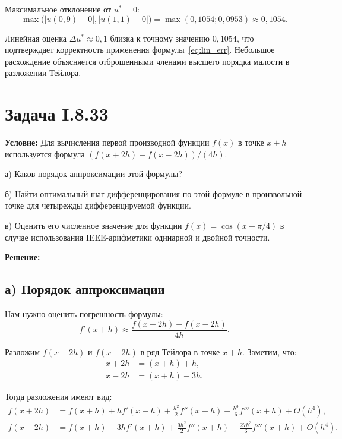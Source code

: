 \documentclass{article}
\begin{document}
Максимальное отклонение от $u^* = 0$:
\begin{equation}
\max\bigl(|u(0{,}9) - 0|, |u(1{,}1) - 0|\bigr) = \max(0{,}1054; 0{,}0953) \approx 0{,}1054.
\end{equation}

Линейная оценка $\Delta u^* \approx 0{,}1$ близка к точному значению $0{,}1054$, что подтверждает корректность применения формулы~\eqref{eq:lin_err}. Небольшое расхождение объясняется отброшенными членами высшего порядка малости в разложении Тейлора.



\section*{Задача I.8.33}

\textbf{Условие:} Для вычисления первой производной функции $f(x)$ в точке $x + h$ используется формула $(f(x+2h) - f(x-2h))/(4h)$.

а) Каков порядок аппроксимации этой формулы?

б) Найти оптимальный шаг дифференцирования по этой формуле в произвольной точке для четырежды дифференцируемой функции.

в) Оценить его численное значение для функции $f(x) = \cos(x + \pi/4)$ в случае использования IEEE-арифметики одинарной и двойной точности.

\vspace{0.5cm}
\textbf{Решение:}

\subsection*{а) Порядок аппроксимации}

Нам нужно оценить погрешность формулы:
\begin{equation}
f'(x+h) \approx \frac{f(x+2h) - f(x-2h)}{4h}.
\label{eq:formula}
\end{equation}

Разложим $f(x+2h)$ и $f(x-2h)$ в ряд Тейлора в точке $x+h$. Заметим, что:
\begin{align}
x + 2h &= (x+h) + h, \\
x - 2h &= (x+h) - 3h.
\end{align}

Тогда разложения имеют вид:
\begin{align}
f(x+2h) &= f(x+h) + h f'(x+h) + \frac{h^2}{2} f''(x+h) + \frac{h^3}{6} f'''(x+h) + O(h^4), \\
f(x-2h) &= f(x+h) - 3h f'(x+h) + \frac{9h^2}{2} f''(x+h) - \frac{27h^3}{6} f'''(x+h) + O(h^4).
\end{align}
\end{document}
